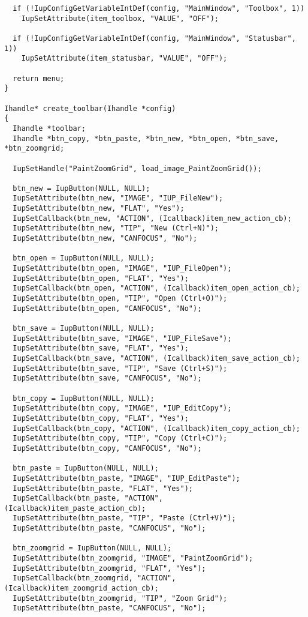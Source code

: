 \documentclass{ctexart}
\begin{document}
\begin{lstlisting}
  if (!IupConfigGetVariableIntDef(config, "MainWindow", "Toolbox", 1))
    IupSetAttribute(item_toolbox, "VALUE", "OFF");

  if (!IupConfigGetVariableIntDef(config, "MainWindow", "Statusbar", 1))
    IupSetAttribute(item_statusbar, "VALUE", "OFF");

  return menu;
}

Ihandle* create_toolbar(Ihandle *config)
{
  Ihandle *toolbar;
  Ihandle *btn_copy, *btn_paste, *btn_new, *btn_open, *btn_save, *btn_zoomgrid;

  IupSetHandle("PaintZoomGrid", load_image_PaintZoomGrid());

  btn_new = IupButton(NULL, NULL);
  IupSetAttribute(btn_new, "IMAGE", "IUP_FileNew");
  IupSetAttribute(btn_new, "FLAT", "Yes");
  IupSetCallback(btn_new, "ACTION", (Icallback)item_new_action_cb);
  IupSetAttribute(btn_new, "TIP", "New (Ctrl+N)");
  IupSetAttribute(btn_new, "CANFOCUS", "No");

  btn_open = IupButton(NULL, NULL);
  IupSetAttribute(btn_open, "IMAGE", "IUP_FileOpen");
  IupSetAttribute(btn_open, "FLAT", "Yes");
  IupSetCallback(btn_open, "ACTION", (Icallback)item_open_action_cb);
  IupSetAttribute(btn_open, "TIP", "Open (Ctrl+O)");
  IupSetAttribute(btn_open, "CANFOCUS", "No");

  btn_save = IupButton(NULL, NULL);
  IupSetAttribute(btn_save, "IMAGE", "IUP_FileSave");
  IupSetAttribute(btn_save, "FLAT", "Yes");
  IupSetCallback(btn_save, "ACTION", (Icallback)item_save_action_cb);
  IupSetAttribute(btn_save, "TIP", "Save (Ctrl+S)");
  IupSetAttribute(btn_save, "CANFOCUS", "No");

  btn_copy = IupButton(NULL, NULL);
  IupSetAttribute(btn_copy, "IMAGE", "IUP_EditCopy");
  IupSetAttribute(btn_copy, "FLAT", "Yes");
  IupSetCallback(btn_copy, "ACTION", (Icallback)item_copy_action_cb);
  IupSetAttribute(btn_copy, "TIP", "Copy (Ctrl+C)");
  IupSetAttribute(btn_copy, "CANFOCUS", "No");

  btn_paste = IupButton(NULL, NULL);
  IupSetAttribute(btn_paste, "IMAGE", "IUP_EditPaste");
  IupSetAttribute(btn_paste, "FLAT", "Yes");
  IupSetCallback(btn_paste, "ACTION", (Icallback)item_paste_action_cb);
  IupSetAttribute(btn_paste, "TIP", "Paste (Ctrl+V)");
  IupSetAttribute(btn_paste, "CANFOCUS", "No");

  btn_zoomgrid = IupButton(NULL, NULL);
  IupSetAttribute(btn_zoomgrid, "IMAGE", "PaintZoomGrid");
  IupSetAttribute(btn_zoomgrid, "FLAT", "Yes");
  IupSetCallback(btn_zoomgrid, "ACTION", (Icallback)item_zoomgrid_action_cb);
  IupSetAttribute(btn_zoomgrid, "TIP", "Zoom Grid");
  IupSetAttribute(btn_paste, "CANFOCUS", "No");


\end{lstlisting}
\end{document}

